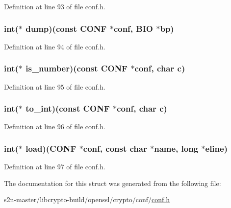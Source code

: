 Definition at line 93 of file conf.\+h.

\subsubsection[{\texorpdfstring{dump}{dump}}]{\setlength{\rightskip}{0pt plus 5cm}int($\ast$ dump)(const {\bf C\+O\+NF} $\ast$conf, {\bf B\+IO} $\ast${\bf bp})}\hypertarget{structconf__method__st_ad1fb4d6aba428459f0739536eec3e751}{}\label{structconf__method__st_ad1fb4d6aba428459f0739536eec3e751}


Definition at line 94 of file conf.\+h.

\subsubsection[{\texorpdfstring{is\+\_\+number}{is_number}}]{\setlength{\rightskip}{0pt plus 5cm}int($\ast$ is\+\_\+number)(const {\bf C\+O\+NF} $\ast$conf, char {\bf c})}\hypertarget{structconf__method__st_a2c94c00027306e6fdf21d38430b80cdc}{}\label{structconf__method__st_a2c94c00027306e6fdf21d38430b80cdc}


Definition at line 95 of file conf.\+h.

\subsubsection[{\texorpdfstring{to\+\_\+int}{to_int}}]{\setlength{\rightskip}{0pt plus 5cm}int($\ast$ to\+\_\+int)(const {\bf C\+O\+NF} $\ast$conf, char {\bf c})}\hypertarget{structconf__method__st_ad5d0e6e58fc09b50735c96f2eb6503b2}{}\label{structconf__method__st_ad5d0e6e58fc09b50735c96f2eb6503b2}


Definition at line 96 of file conf.\+h.

\subsubsection[{\texorpdfstring{load}{load}}]{\setlength{\rightskip}{0pt plus 5cm}int($\ast$ load)({\bf C\+O\+NF} $\ast$conf, const char $\ast${\bf name}, long $\ast${\bf eline})}\hypertarget{structconf__method__st_ae324bba0fcae31924c74004af2603ea9}{}\label{structconf__method__st_ae324bba0fcae31924c74004af2603ea9}


Definition at line 97 of file conf.\+h.



The documentation for this struct was generated from the following file\+:\begin{DoxyCompactItemize}
\item 
s2n-\/master/libcrypto-\/build/openssl/crypto/conf/\hyperlink{crypto_2conf_2conf_8h}{conf.\+h}\end{DoxyCompactItemize}
